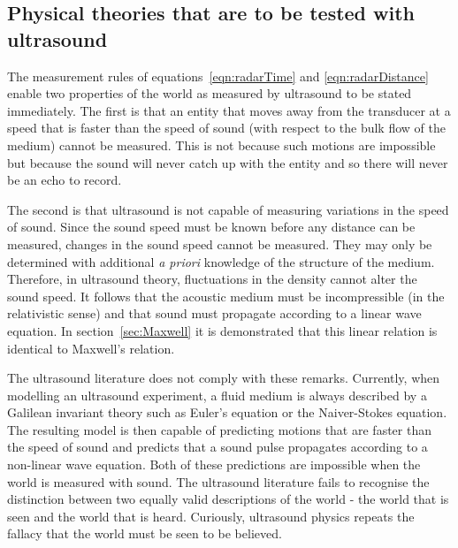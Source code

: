 \documentclass[10pt, fleqn,final,showtrims,oldfontcommands, article,a4paper,oneside]{memoir} %
\newcommand{\secref}[1]{section~\ref{sec:#1}}
\begin{document}
\subsection{Physical theories  that are to be tested with ultrasound}

The measurement rules of equations~\ref{eqn:radarTime} and \ref{eqn:radarDistance} enable two properties of the world as measured by ultrasound to be stated immediately.
The first is that an entity that moves away from the transducer at a speed that is faster than the speed of sound (with respect to the bulk flow of the medium) 
cannot be measured.  
This is not because such motions are impossible but because the sound will never catch  up with the entity and so there will never be an echo to record.

The second is that ultrasound is not capable of  measuring variations in the speed of sound.
Since the sound speed must be known before any distance can be measured,
changes in the sound speed  cannot be measured. 
They may only be determined  with additional {\em a priori} knowledge of the structure of the medium. 
Therefore, in ultrasound theory, fluctuations in the density  cannot alter the sound speed. %
It follows that the acoustic medium must be incompressible (in the relativistic sense\cite{Pekeris1976, Pekeris1977, Taub1978})
and that  sound must propagate according to a linear wave equation. %
In \secref{Maxwell} it is demonstrated that this linear relation is identical to Maxwell's relation.

The ultrasound literature does not comply with these remarks.
Currently, when modelling an ultrasound experiment, a fluid medium is always described by a Galilean invariant theory such as Euler's equation or the Naiver-Stokes equation.
The resulting model is then capable of predicting motions that are faster than the speed of sound
and predicts that  a sound pulse  propagates according to  a non-linear wave equation.
Both of these predictions are impossible when the world is measured with sound.
%
The ultrasound literature fails to recognise the distinction between  two equally valid descriptions of the world -
the world that is seen
and the world that is heard.
Curiously, ultrasound physics repeats the   fallacy that  the world must be seen to be believed.
\end{document}
